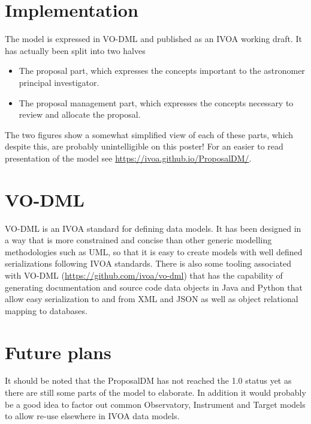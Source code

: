 \documentclass[11pt,twoside]{article}
\begin{document}
    \section{Implementation}
        The model is expressed in VO-DML and published as an IVOA working draft. It has actually been split into two halves
        \begin{itemize}
            \item The proposal part, which expresses the concepts important to the astronomer principal investigator.
            \item The proposal management part, which expresses the concepts necessary to review and allocate the proposal.
        \end{itemize}
        The two figures show a somewhat simplified view of each of these parts, which despite this, are probably unintelligible on
        this poster!
        For an easier to read presentation of the model see \href{https://ivoa.github.io/ProposalDM/}{https://ivoa.github.io/ProposalDM/}.







    \section{VO-DML}
        VO-DML \citep{2018ivoa.spec.0910L} is an IVOA standard for defining data models.
        It has been designed in a way that is more constrained and concise than other generic modelling methodologies such
        as UML, so that it is easy to create models with well defined serializations following IVOA standards.
        There is also some tooling associated with VO-DML (\href{https://github.com/ivoa/vo-dml}{https://github.com/ivoa/vo-dml}) that
        has the capability of generating documentation and source code data objects in Java and Python that allow
        easy serialization to and from XML and JSON as well as object relational mapping to databases.


    \section{Future plans}
        It should be noted that the ProposalDM has not reached the 1.0 status yet as there are still some parts of the model to elaborate.
        In addition it would probably be a good idea to factor out common Observatory, Instrument and Target models to allow re-use elsewhere in IVOA data models.
\end{document}
